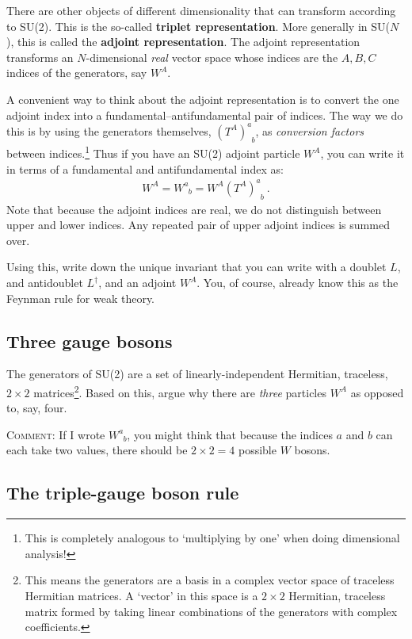 \documentclass[12pt]{article}
\numberwithin{equation}{section}    %
\begin{document}
There are other objects of different dimensionality that can transform according to SU(2). This is the so-called \textbf{triplet representation}. More generally in SU($N$), this is called the \textbf{adjoint representation}. The adjoint representation transforms an $N$-dimensional \emph{real} vector space whose indices are the $A,B,C$ indices of the generators, say $W^A$. 

A convenient way to think about the adjoint representation is to convert the one adjoint index into a fundamental--antifundamental pair of indices. The way we do this is by using the generators themselves, $(T^A)^a_{\phantom{a}b}$, as \emph{conversion factors} between indices.\footnote{This is completely analogous to `multiplying by one' when doing dimensional analysis!} Thus if you have an SU(2) adjoint particle $W^A$, you can write it in terms of a fundamental and antifundamental index as:
\begin{align}
 	W^A = W^a_{\phantom{a}b} = W^A (T^A)^a_{\phantom{a}b} \ .
 \end{align}
 Note that because the adjoint indices are real, we do not distinguish between upper and lower indices. Any repeated pair of upper adjoint indices is summed over. 

 Using this, write down the unique invariant that you can write with a doublet $L$, and antidoublet $L^\dag$, and an adjoint $W^A$. You, of course, already know this as the Feynman rule for weak theory. 

 \subsection{Three gauge bosons}

 The generators of SU(2) are a set of linearly-independent Hermitian, traceless, $2\times 2$ matrices\footnote{This means the generators are a basis in a complex vector space of traceless Hermitian matrices. A `vector' in this space is a $2\times 2$ Hermitian, traceless matrix formed by taking linear combinations of the generators with complex coefficients.}. Based on this, argue why there are \emph{three} particles $W^A$ as opposed to, say, four. 

\textsc{Comment:} If I wrote $W^a_{\phantom{a}b}$, you might think that because the indices $a$ and $b$ can each take two values, there should be $2\times 2 = 4$ possible $W$ bosons. 

\subsection{The triple-gauge boson rule}
\end{document}
